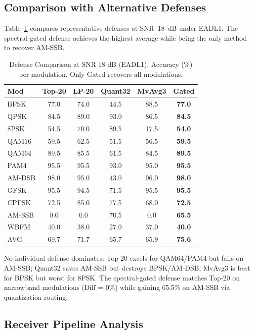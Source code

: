 \documentclass[letterpaper,twocolumn,10pt]{article}
\begin{document}
\subsection{Comparison with Alternative Defenses}

Table~\ref{tab:17def} compares representative defenses at SNR~18~dB
under EADL1. The spectral-gated defense achieves the highest average
while being the only method to recover AM-SSB.

\begin{table}[t]
\caption{Defense Comparison at SNR 18 dB (EADL1). Accuracy (\%)
  per modulation. Only Gated recovers all modulations.}
\label{tab:17def}
\centering
\scriptsize
\begin{tabular}{lccccc}
\toprule
Mod & Top-20 & LP-20 & Quant32 & MvAvg3 & \textbf{Gated} \\
\midrule
BPSK   & 77.0 & 74.0 &  44.5 & 88.5 & \textbf{77.0} \\
QPSK   & 84.5 & 89.0 &  93.0 & 86.5 & \textbf{84.5} \\
8PSK   & 54.5 & 70.0 &  89.5 & 17.5 & \textbf{54.0} \\
QAM16  & 59.5 & 62.5 &  51.5 & 56.5 & \textbf{59.5} \\
QAM64  & 89.5 & 85.5 &  61.5 & 84.5 & \textbf{89.5} \\
PAM4   & 95.5 & 95.5 &  93.0 & 95.0 & \textbf{95.5} \\
AM-DSB & 98.0 & 95.0 &  43.0 & 96.0 & \textbf{98.0} \\
GFSK   & 95.5 & 94.5 &  71.5 & 95.5 & \textbf{95.5} \\
CPFSK  & 72.5 & 85.0 &  77.5 & 68.0 & \textbf{72.5} \\
AM-SSB &  0.0 &  0.0 &  70.5 &  0.0 & \textbf{65.5} \\
WBFM   & 40.0 & 38.0 &  27.0 & 37.0 & \textbf{40.0} \\
\midrule
AVG    & 69.7 & 71.7 &  65.7 & 65.9 & \textbf{75.6} \\
\bottomrule
\end{tabular}
\end{table}

No individual defense dominates: Top-20 excels for QAM64/PAM4 but
fails on AM-SSB; Quant32 saves AM-SSB but destroys BPSK/AM-DSB;
MvAvg3 is best for BPSK but worst for 8PSK. The spectral-gated
defense matches Top-20 on narrowband modulations (Diff = 0\%) while
gaining 65.5\% on AM-SSB via quantization routing.

\subsection{Receiver Pipeline Analysis}
\end{document}
